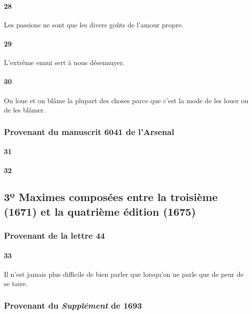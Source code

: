 \documentclass[french,twoside]{book} %
\begin{document}
\paragraph[{28}]{ \textsc{28} }
\noindent Les passions ne sont que les divers goûts de l’amour propre.
\paragraph[{29}]{ \textsc{29} }
\noindent L’extrême ennui sert à nous désennuyer.
\paragraph[{30}]{ \textsc{30} }
\noindent On loue et on blâme la plupart des choses parce que c’est la mode de les louer ou de les blâmer.
\subsubsection[{Provenant du manuscrit 6041 de l’Arsenal}]{Provenant du manuscrit 6041 de l’Arsenal}
\paragraph[{31}]{ \textsc{31} }
\paragraph[{32}]{ \textsc{32} }
\subsection[{3º Maximes composées entre la troisième (1671) et la quatrième édition (1675)}]{3º Maximes composées entre la troisième (1671) et la quatrième édition (1675)}
\subsubsection[{Provenant de la lettre 44}]{Provenant de la lettre 44}
\paragraph[{33}]{ \textsc{33} }
\noindent Il n’est jamais plus difficile de bien parler que lorsqu’on ne parle que de peur de se taire.
\subsubsection[{Provenant du Supplément de 1693}]{Provenant du {\itshape Supplément} de 1693}
\end{document}
